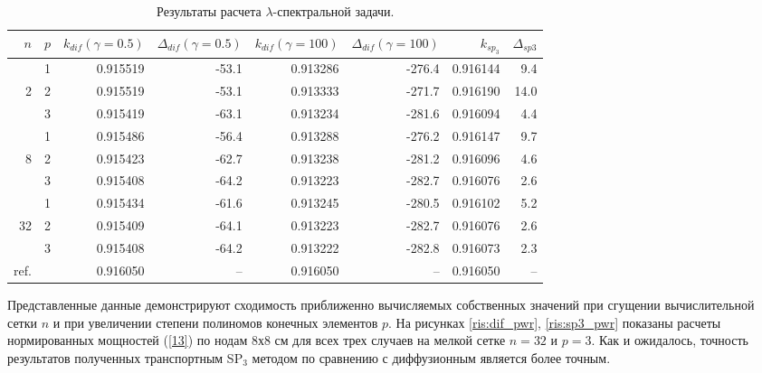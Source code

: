 \documentclass{crm-article}
\begin{document}
\begin{table}[h]
\caption{Результаты расчета $\lambda$-спектральной задачи.}
\label{table:t2-lamda}
\begin{center}
\begin{tabular}{r r r r r r r r}
\hline
$n$ & $p$ & $k_{dif} (\gamma=0.5)$ & $\Delta_{dif}(\gamma=0.5)$ & $k_{dif} (\gamma=100)$ & $\Delta_{dif}(\gamma=100)$ & $k_{sp_3}$ & $\Delta_{sp3}$\\
\hline
	& 1	& 0.915519 & -53.1& 0.913286 & -276.4& 0.916144 & 9.4\\
2	& 2	& 0.915519 & -53.1& 0.913333 & -271.7& 0.916190 &14.0\\
	& 3	& 0.915419 & -63.1& 0.913234 & -281.6& 0.916094 & 4.4\\ 
\hline
	& 1	& 0.915486 & -56.4& 0.913288 & -276.2& 0.916147 & 9.7\\
8& 2	& 0.915423 & -62.7& 0.913238 & -281.2& 0.916096 & 4.6\\
	& 3	& 0.915408 & -64.2& 0.913223 & -282.7& 0.916076 & 2.6\\ 
\hline
	& 1	& 0.915434 & -61.6& 0.913245 & -280.5& 0.916102 & 5.2\\
32& 2	& 0.915409 & -64.1& 0.913223 & -282.7& 0.916076 & 2.6\\
	& 3	& 0.915408 & -64.2& 0.913222 & -282.8& 0.916073 & 2.3\\
\hline
ref.&   & 0.916050 & --   & 0.916050 & -- & 0.916050 & --\\
\hline
\end{tabular}
\end{center}
\end{table}

Представленные данные демонстрируют сходимость приближенно вычисляемых собственных значений при сгущении вычислительной сетки $n$ и при увеличении степени полиномов конечных элементов $p$.
На рисунках \ref{ris:dif_pwr}, \ref{ris:sp3_pwr} показаны расчеты нормированных мощностей (\ref{13}) по нодам 8х8 см для всех трех случаев на мелкой сетке $n=32$ и $p=3$.
Как и ожидалось, точность результатов полученных транспортным SP$_3$ методом по сравнению с диффузионным является более точным. 
\end{document}
